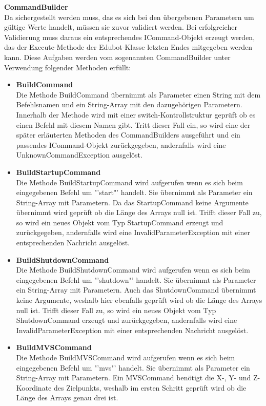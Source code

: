 \textbf{CommandBuilder}\\
Da sichergestellt werden muss, das es sich bei den übergebenen Parametern um gültige Werte handelt, müssen sie zuvor validiert werden. Bei erfolgreicher Validierung muss daraus ein entsprechendes ICommand-Objekt erzeugt werden, das der Execute-Methode der Edubot-Klasse letzten Endes mitgegeben werden kann. Diese Aufgaben werden vom sogenannten CommandBuilder unter Verwendung folgender Methoden erfüllt:
\begin{itemize}
\item \textbf{BuildCommand}\\
Die Methode BuildCommand übernimmt als Parameter einen String mit dem Befehlsnamen und ein String-Array mit den dazugehörigen Parametern. Innerhalb der Methode wird mit einer switch-Kontrollstruktur geprüft ob es einen Befehl mit diesem Namen gibt. Tritt dieser Fall ein, so wird eine der später erläuterten Methoden des CommandBuilders ausgeführt und ein passendes ICommand-Objekt zurückgegeben, andernfalls wird eine UnknownCommandException ausgelöst. 
\item \textbf{BuildStartupCommand}\\
Die Methode BuildStartupCommand wird aufgerufen wenn es sich beim eingegebenen Befehl um "'start"' handelt. Sie übernimmt als Parameter ein String-Array mit Parametern. Da das StartupCommand keine Argumente übernimmt wird geprüft ob die Länge des Arrays null ist. Trifft dieser Fall zu, so wird ein neues Objekt vom Typ StartupCommand erzeugt und zurückgegeben, andernfalls wird eine InvalidParameterException mit einer entsprechenden Nachricht ausgelöst.
\item \textbf{BuildShutdownCommand}\\
Die Methode BuildShutdownCommand wird aufgerufen wenn es sich beim eingegebenen Befehl um "'shutdown"' handelt. Sie übernimmt als Parameter ein String-Array mit Parametern. Auch das ShutdownCommand übernimmt keine Argumente, weshalb hier ebenfalls geprüft wird ob die Länge des Arrays null ist. Trifft dieser Fall zu, so wird ein neues Objekt vom Typ ShutdownCommand erzeugt und zurückgegeben, andernfalls wird eine InvalidParameterException mit einer entsprechenden Nachricht ausgelöst.
\item \textbf{BuildMVSCommand}\\
Die Methode BuildMVSCommand wird aufgerufen wenn es sich beim eingegebenen Befehl um "'mvs"' handelt. Sie übernimmt als Parameter ein String-Array mit Parametern. Ein MVSCommand benötigt die X-, Y- und Z-Koordinate des Zielpunkts, weshalb im ersten Schritt geprüft wird ob die Länge des Arrays genau drei ist.\\

\end{itemize}
